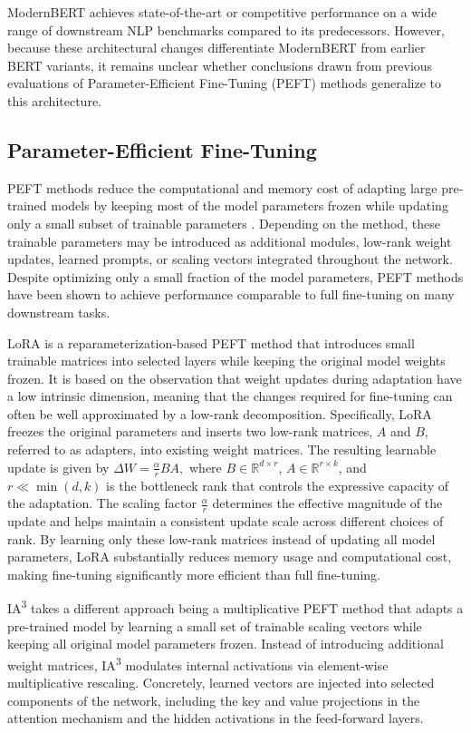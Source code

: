 \documentclass[11pt]{article}
\begin{document}
ModernBERT achieves state-of-the-art or competitive performance on a wide range of downstream NLP benchmarks compared to its predecessors. However, because these architectural changes differentiate ModernBERT from earlier BERT variants, it remains unclear whether conclusions drawn from previous evaluations of Parameter-Efficient Fine-Tuning (PEFT) methods generalize to this architecture.

\subsection{Parameter-Efficient Fine-Tuning}

PEFT methods reduce the computational and memory cost of adapting large pre-trained models by keeping most of the model parameters frozen while updating only a small subset of trainable parameters \cite{hanParameterEfficientFineTuningLarge2024}. Depending on the method, these trainable parameters may be introduced as additional modules, low-rank weight updates, learned prompts, or scaling vectors integrated throughout the network. Despite optimizing only a small fraction of the model parameters, PEFT methods have been shown to achieve performance comparable to full fine-tuning on many downstream tasks.


LoRA \cite{hu2021lora} is a reparameterization-based PEFT method that introduces small trainable matrices into selected layers while keeping the original model weights frozen. It is based on the observation that weight updates during adaptation have a low intrinsic dimension, meaning that the changes required for fine-tuning can often be well approximated by a low-rank decomposition. Specifically, LoRA freezes the original parameters and inserts two low-rank matrices, $A$ and $B$, referred to as adapters, into existing weight matrices. The resulting learnable update is given by
$
\Delta W = \frac{\alpha}{r}BA,
$
where $B \in \mathbb{R}^{d \times r}$, $A \in \mathbb{R}^{r \times k}$, and $r \ll \min(d, k)$ is the bottleneck rank that controls the expressive capacity of the adaptation. The scaling factor $\frac{\alpha}{r}$ determines the effective magnitude of the update and helps maintain a consistent update scale across different choices of rank. By learning only these low-rank matrices instead of updating all model parameters, LoRA substantially reduces memory usage and computational cost, making fine-tuning significantly more efficient than full fine-tuning.

IA\textsuperscript{3} \cite{liu2022ia3} takes a different approach being a multiplicative PEFT method that adapts a pre-trained model by learning a small set of trainable scaling vectors while keeping all original model parameters frozen. Instead of introducing additional weight matrices, IA\textsuperscript{3} modulates internal activations via element-wise multiplicative rescaling. Concretely, learned vectors are injected into selected components of the network, including the key and value projections in the attention mechanism and the hidden activations in the feed-forward layers.
\end{document}

